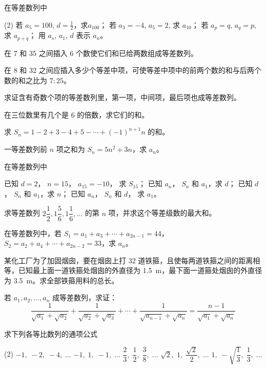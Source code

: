 \begin{Exercise}
\begin{question}
  \item 在等差数列中
  \begin{tasks}(2)
    \task 若 $a_5=100$, $d=\frac{1}{2}$，求$a_{100}$；
    \task 若 $a_3=-4$, $a_5=2$, 求 $a_{10}$；
    \task 若 $a_p=q$, $a_q=p$, 求 $a_{p+q}$；
    \task 用 $a_s$, $a_1$, $d$ 表示 $a_n$。
  \end{tasks}

\item 在 7 和 35 之间插入 6 个数使它们和已给两数组成等差数列。
\item 在 8 和 32 之间应插入多少个等差中项，可使等差中项中的前两个数的和与后两个数的和之比为 $7:25$。
\item 求证含有奇数个项的等差数列里，第一项，中间项，最后项也成等差数列。
\item 在三位数里有几个是 6 的倍数，求它们的和。
\item 求 $S_n=1-2+3-4+5-\cdots+(-1)^{n+1}n$ 的和。
\item 一等差数列前 $n$ 项之和为 $S_n=5n^2+3n$，求 $a_n$。
\item 在等差数列中
\begin{tasks}
  \task 已知 $d=2$， $n=15$， $a_{15}=-10$， 求 $S_{15}$；
  \task 已知 $a_n$， $S_n$ 和 $a_1$，求 $d$；
  \task 已知 $d$， $S_n$ 和 $a_1$，求 $n$；
  \task 已知 $a_n$， $S_n$ 和 $d$， 求 $a_1$。
\end{tasks}

\item 求等差数列 $2\dfrac{1}{2},1\dfrac{5}{6},1\dfrac{1}{6},\ldots$ 的第 $n$ 项，并求这个等差级数的最大和。

\bigskip
\item 在等差数列中，若 $S_1=a_1+a_3+\cdots+a_{2n-1}=44$，$S_2=a_2+a_4+\cdots+a_{2n-2}=33$，求 $a_n$。
\item 某化工厂为了加固烟囱，要在烟囱上打 32 道铁箍，且使每两道铁箍之间的距离相等，已知最上面一道铁箍处烟囱的外直径为 \qty{1.5}{m}，最下面一道箍处烟囱的外直径为 \qty{3.5}{m}。求全部铁箍用料的总长。

\item 若 $a_1,a_2,\ldots,a_n$ 成等差数列，求证：
\[\frac{1}{\sqrt{a_1}+\sqrt{a_2}}+\frac{1}{\sqrt{a_2}+\sqrt{a_3}}+\cdots +\frac{1}{\sqrt{a_{n-1}}+\sqrt{a_n}}=\frac{n-1}{\sqrt{a_1}+\sqrt{a_n}}\]

\item 求下列各等比数列的通项公式
\begin{tasks}(2)
    \task $-1,\;-2,\;-4,\;\ldots$
    \task $-1,\;1,\;-1,\;\ldots$
    \task $\dfrac{2}{3},\;\dfrac{1}{2},\;\dfrac{3}{8},\;\ldots$
    \task $\sqrt{2},\;1,\;\dfrac{\sqrt{2}}{2},\;\ldots$
    \task $1,\;-\sqrt{\dfrac{1}{3}},\;\dfrac{1}{3},\;\ldots$
\end{tasks}


\end{question}
\end{Exercise}
